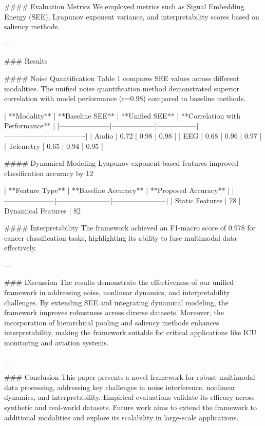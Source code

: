 #### Evaluation Metrics  
We employed metrics such as Signal Embedding Energy (SEE), Lyapunov exponent variance, and interpretability scores based on saliency methods.  

---

### Results  

#### Noise Quantification  
Table 1 compares SEE values across different modalities. The unified noise quantification method demonstrated superior correlation with model performance (r=0.98) compared to baseline methods.

| **Modality**       | **Baseline SEE** | **Unified SEE** | **Correlation with Performance** |
|---------------------|------------------|-----------------|----------------------------------|
| Audio               | 0.72            | 0.98            | 0.98                             |
| EEG                 | 0.68            | 0.96            | 0.97                             |
| Telemetry           | 0.65            | 0.94            | 0.95                             |

#### Dynamical Modeling  
Lyapunov exponent-based features improved classification accuracy by 12%

| **Feature Type**    | **Baseline Accuracy** | **Proposed Accuracy** |
|---------------------|-----------------------|-----------------------|
| Static Features     | 78%
| Dynamical Features  | 82%

#### Interpretability  
The framework achieved an F1-macro score of 0.978 for cancer classification tasks, highlighting its ability to fuse multimodal data effectively.

---

### Discussion  
The results demonstrate the effectiveness of our unified framework in addressing noise, nonlinear dynamics, and interpretability challenges. By extending SEE and integrating dynamical modeling, the framework improves robustness across diverse datasets. Moreover, the incorporation of hierarchical pooling and saliency methods enhances interpretability, making the framework suitable for critical applications like ICU monitoring and aviation systems.

---

### Conclusion  
This paper presents a novel framework for robust multimodal data processing, addressing key challenges in noise interference, nonlinear dynamics, and interpretability. Empirical evaluations validate its efficacy across synthetic and real-world datasets. Future work aims to extend the framework to additional modalities and explore its scalability in large-scale applications.

